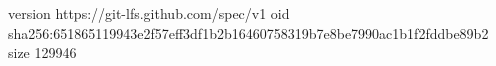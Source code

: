 version https://git-lfs.github.com/spec/v1
oid sha256:651865119943e2f57eff3df1b2b16460758319b7e8be7990ac1b1f2fddbe89b2
size 129946
